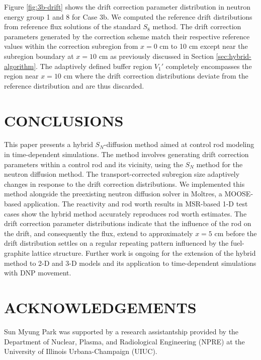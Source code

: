 \documentclass[letterpaper]{mc2025}
\begin{document}
Figure \ref{fig:3b-drift} shows the drift correction parameter distribution in neutron energy
group 1 and 8 for Case 3b. We computed the reference drift distributions from reference flux
solutions of the standard $S_8$ method.
The drift correction parameters generated by the correction scheme match their respective reference
values within the correction subregion from $x=0$ cm to 10 cm except near the subregion boundary at
$x=10$ cm as previously discussed in Section \ref{sec:hybrid-algorithm}. The adaptively defined
buffer region $V_1'$ completely encompasses the region near $x=10$ cm where the drift correction
distributions deviate from the reference distribution and are thus discarded.

\section{CONCLUSIONS}

This paper presents a hybrid $S_N$-diffusion method aimed at control rod modeling in time-dependent
simulations. The method involves generating drift correction parameters within a control rod and
its vicinity, using the $S_N$ method for the neutron diffusion method. The transport-corrected
subregion size adaptively changes in response to the drift correction distributions. We implemented
this method alongside the preexisting neutron diffusion solver in Moltres, a \gls*{MOOSE}-based
application. The reactivity and rod worth results in \gls*{MSR}-based 1-D test cases show the hybrid
method accurately reproduces rod worth estimates. The drift correction parameter
distributions indicate that the influence of the rod on the drift, and
consequently the flux, extend to approximately $x=5$ cm before the drift distribution settles on a
regular repeating pattern influenced by the fuel-graphite lattice structure. Further work is
ongoing for the extension of the hybrid method to 2-D and 3-D models and its application to
time-dependent simulations with \gls*{DNP} movement.

\section*{ACKNOWLEDGEMENTS}
Sun Myung Park was supported by a research assistantship provided by the Department of Nuclear,
Plasma, and Radiological Engineering (NPRE) at the University of Illinois Urbana-Champaign (UIUC).



\end{document}
